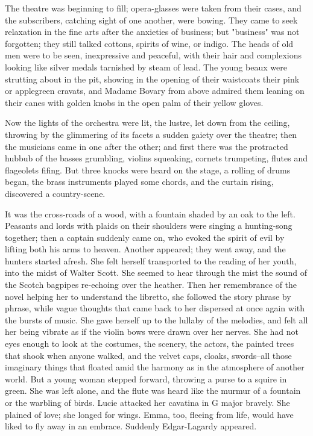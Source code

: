 \documentclass[11pt,twocolumn]{ltugboat}
\begin{document}
The theatre was beginning to fill; opera-glasses were taken from their
cases, and the subscribers, catching sight of one another, were bowing.
They came to seek relaxation in the fine arts after the anxieties of
business; but "business" was not forgotten; they still talked cottons,
spirits of wine, or indigo. The heads of old men were to be seen,
inexpressive and peaceful, with their hair and complexions looking like
silver medals tarnished by steam of lead. The young beaux were strutting
about in the pit, showing in the opening of their waistcoats their pink
or applegreen cravats, and Madame Bovary from above admired them leaning
on their canes with golden knobs in the open palm of their yellow
gloves.

Now the lights of the orchestra were lit, the lustre, let down from the
ceiling, throwing by the glimmering of its facets a sudden gaiety over
the theatre; then the musicians came in one after the other; and
first there was the protracted hubbub of the basses grumbling, violins
squeaking, cornets trumpeting, flutes and flageolets fifing. But three
knocks were heard on the stage, a rolling of drums began, the brass
instruments played some chords, and the curtain rising, discovered a
country-scene.

It was the cross-roads of a wood, with a fountain shaded by an oak to
the left. Peasants and lords with plaids on their shoulders were singing
a hunting-song together; then a captain suddenly came on, who evoked
the spirit of evil by lifting both his arms to heaven. Another appeared;
they went away, and the hunters started afresh. She felt herself
transported to the reading of her youth, into the midst of Walter Scott.
She seemed to hear through the mist the sound of the Scotch bagpipes
re-echoing over the heather. Then her remembrance of the novel helping
her to understand the libretto, she followed the story phrase by phrase,
while vague thoughts that came back to her dispersed at once again with
the bursts of music. She gave herself up to the lullaby of the melodies,
and felt all her being vibrate as if the violin bows were drawn over her
nerves. She had not eyes enough to look at the costumes, the scenery,
the actors, the painted trees that shook when anyone walked, and the
velvet caps, cloaks, swords--all those imaginary things that floated
amid the harmony as in the atmosphere of another world. But a young
woman stepped forward, throwing a purse to a squire in green. She was
left alone, and the flute was heard like the murmur of a fountain or the
warbling of birds. Lucie attacked her cavatina in G major bravely. She
plained of love; she longed for wings. Emma, too, fleeing from life,
would have liked to fly away in an embrace. Suddenly Edgar-Lagardy
appeared.
\end{document}
